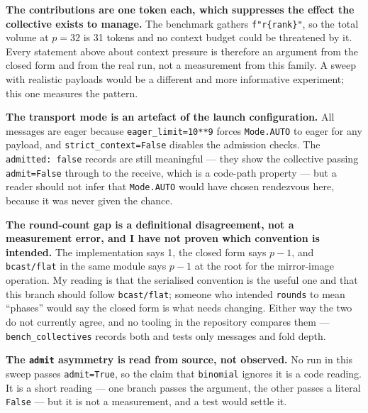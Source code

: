 \documentclass[11pt]{article}
\begin{document}
\textbf{The contributions are one token each, which suppresses the effect the collective exists
to manage.} The benchmark gathers \verb|f"r{rank}"|, so the total volume at $p=32$ is 31 tokens
and no context budget could be threatened by it. Every statement above about context pressure is
therefore an argument from the closed form and from the real run, not a measurement from this
family. A sweep with realistic payloads would be a different and more informative experiment;
this one measures the pattern.

\textbf{The transport mode is an artefact of the launch configuration.} All messages are eager
because \texttt{eager\_limit=10**9} forces \texttt{Mode.AUTO} to eager for any payload, and
\texttt{strict\_context=False} disables the admission checks. The \texttt{admitted: false}
records are still meaningful --- they show the collective passing \texttt{admit=False} through to
the receive, which is a code-path property --- but a reader should not infer that
\texttt{Mode.AUTO} would have chosen rendezvous here, because it was never given the chance.

\textbf{The round-count gap is a definitional disagreement, not a measurement error, and I have
not proven which convention is intended.} The implementation says 1, the closed form says $p-1$,
and \texttt{bcast/flat} in the same module says $p-1$ at the root for the mirror-image
operation. My reading is that the serialised convention is the useful one and that this branch
should follow \texttt{bcast/flat}; someone who intended \texttt{rounds} to mean ``phases'' would
say the closed form is what needs changing. Either way the two do not currently agree, and no
tooling in the repository compares them --- \texttt{bench\_collectives} records both and tests
only messages and fold depth.

\textbf{The \texttt{admit} asymmetry is read from source, not observed.} No run in this sweep
passes \texttt{admit=True}, so the claim that \texttt{binomial} ignores it is a code reading. It
is a short reading --- one branch passes the argument, the other passes a literal \texttt{False}
--- but it is not a measurement, and a test would settle it.
\end{document}
